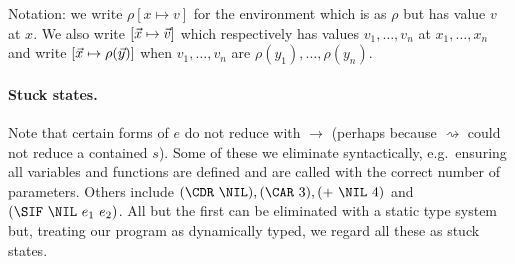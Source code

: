 \documentclass{llncs}
\def\myvec{\mathaccent"017E } %
\begin{document}
Notation:  we write $\rho[x \mapsto v]$ for the environment which is
as $\rho$ but has value $v$ at $x$.
We also write $[\myvec{x} \mapsto \myvec{v}]$ which respectively
has values $v_1, \ldots, v_n$ at $x_1, \ldots, x_n$ and write
$[\myvec{x} \mapsto \rho(\myvec{y})]$ when 
$v_1, \ldots, v_n$ are $\rho(y_1), \ldots, \rho(y_n)$.

\paragraph{Stuck states.} Note that certain forms of $e$ do not reduce
with $\rightarrow$ (perhaps because $\rightsquigarrow$ could not reduce
a contained $s$).  Some of these we eliminate syntactically, e.g.\
ensuring all variables and functions are defined and are called with
the correct number of parameters.
Others include $(\CDR\ \NIL), (\CAR\ 3), (+\ \NIL\ 4)$ and $(\SIF\ \NIL\ e_1\ e_2)$.
All but the first can be eliminated with a static type system but,
treating our program as dynamically typed, we regard all these
as stuck states.

\end{document}
